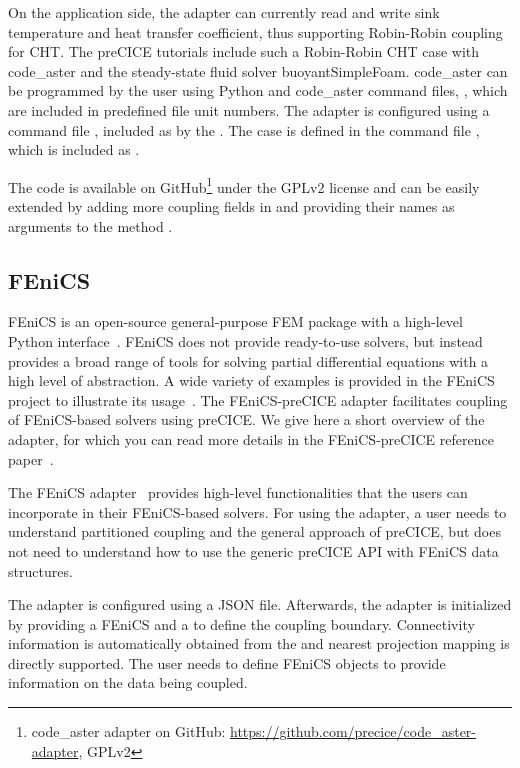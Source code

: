 On the application side, the adapter can currently read and write sink temperature and heat transfer coefficient, thus supporting Robin-Robin coupling for CHT.
The preCICE tutorials include such a Robin-Robin CHT case with code\_aster and the steady-state fluid solver buoyantSimpleFoam.
code\_aster can be programmed by the user using Python and code\_aster command files, , which are included in predefined file unit numbers.
The adapter is configured using a command file , included as  by the .
The case is defined in the command file , which is included as .

The code is available on GitHub\footnote{code\_aster adapter on GitHub: \url{https://github.com/precice/code_aster-adapter}, GPLv2}
under the GPLv2 license and can be easily extended by adding more coupling fields in 
and providing their names as arguments to the method .

\subsection{FEniCS}

FEniCS is an open-source general-purpose FEM package with a high-level Python interface~\cite{AlnaesBlechta2015a}. FEniCS does not provide ready-to-use solvers, but instead provides a broad range of tools for solving partial differential equations with a high level of abstraction. A wide variety of examples is provided in the FEniCS project to illustrate its usage~\cite{Langtangen2016}. The FEniCS-preCICE adapter facilitates coupling of FEniCS-based solvers using preCICE. We give here a short overview of the adapter, for which you can read more details in the FEniCS-preCICE reference paper~\cite{rodenberg2021fenicsprecice}.

The FEniCS adapter~\cite{Monge2018, Hertrich2019} provides high-level functionalities that the users can incorporate in their FEniCS-based solvers. For using the adapter, a user needs to understand partitioned coupling and the general approach of preCICE, but does not need to understand how to use the generic preCICE API with FEniCS data structures.

The adapter is configured using a JSON file. Afterwards, the adapter is initialized by providing a FEniCS  and a  to define the coupling boundary. Connectivity information is automatically obtained from the  and nearest projection mapping is directly supported. The user needs to define FEniCS  objects to provide information on the data being coupled.

